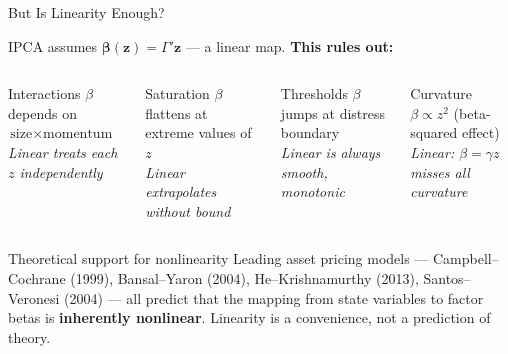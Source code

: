 \documentclass[aspectratio=169]{beamer}
\newcommand{\bz}{\bm{z}}
\newcommand{\bbeta}{\bm{\beta}}
\begin{document}
\begin{frame}{But Is Linearity Enough?}

IPCA assumes $\bbeta(\bz) = \Gamma'\bz$ --- a linear map. \textbf{This rules out:}

\medskip
\begin{columns}[T]
\begin{alertblock}{Interactions}
$\beta$ depends on $\text{size} \times \text{momentum}$\\
\footnotesize\textit{Linear treats each $z$ independently}
\end{alertblock}

\begin{alertblock}{Saturation}
$\beta$ flattens at extreme values of $z$\\
\footnotesize\textit{Linear extrapolates without bound}
\end{alertblock}

\begin{alertblock}{Thresholds}
$\beta$ jumps at distress boundary\\
\footnotesize\textit{Linear is always smooth, monotonic}
\end{alertblock}

\begin{alertblock}{Curvature}
$\beta \propto z^2$ (beta-squared effect)\\
\footnotesize\textit{Linear: $\beta = \gamma z$ misses all curvature}
\end{alertblock}
\end{columns}

\begin{block}{Theoretical support for nonlinearity}
Leading asset pricing models --- Campbell--Cochrane (1999), Bansal--Yaron (2004), He--Krishnamurthy (2013), Santos--Veronesi (2004) --- all predict that the mapping from state variables to factor betas is \textbf{inherently nonlinear}. Linearity is a convenience, not a prediction of theory.
\end{block}

\end{frame}
%
%
\end{document}
